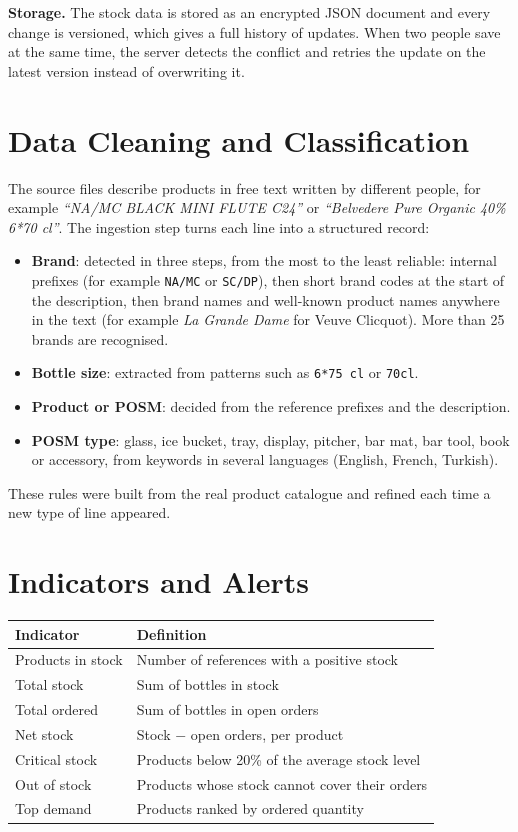 \documentclass[a4paper,11pt]{article}
\newcommand{\code}[1]{\texttt{#1}}
\begin{document}
\textbf{Storage.} The stock data is stored as an encrypted JSON document and every change is versioned, which gives a full history of updates. When two people save at the same time, the server detects the conflict and retries the update on the latest version instead of overwriting it.

\section{Data Cleaning and Classification}\label{sec:classif}

The source files describe products in free text written by different people, for example \emph{``NA/MC BLACK MINI FLUTE C24''} or \emph{``Belvedere Pure Organic 40\% 6*70 cl''}. The ingestion step turns each line into a structured record:

\begin{itemize}
  \item \textbf{Brand}: detected in three steps, from the most to the least reliable: internal prefixes (for example \code{NA/MC} or \code{SC/DP}), then short brand codes at the start of the description, then brand names and well-known product names anywhere in the text (for example \emph{La Grande Dame} for Veuve Clicquot). More than 25 brands are recognised.
  \item \textbf{Bottle size}: extracted from patterns such as \code{6*75 cl} or \code{70cl}.
  \item \textbf{Product or POSM}: decided from the reference prefixes and the description.
  \item \textbf{POSM type}: glass, ice bucket, tray, display, pitcher, bar mat, bar tool, book or accessory, from keywords in several languages (English, French, Turkish).
\end{itemize}
These rules were built from the real product catalogue and refined each time a new type of line appeared.

\section{Indicators and Alerts}

\begin{tabularx}{\linewidth}{@{}lX@{}}
\toprule
\textbf{Indicator} & \textbf{Definition} \\
\midrule
Products in stock & Number of references with a positive stock \\
Total stock & Sum of bottles in stock \\
Total ordered & Sum of bottles in open orders \\
Net stock & Stock $-$ open orders, per product \\
Critical stock & Products below 20\% of the average stock level \\
Out of stock & Products whose stock cannot cover their orders \\
Top demand & Products ranked by ordered quantity \\
\bottomrule
\end{tabularx}
\end{document}
